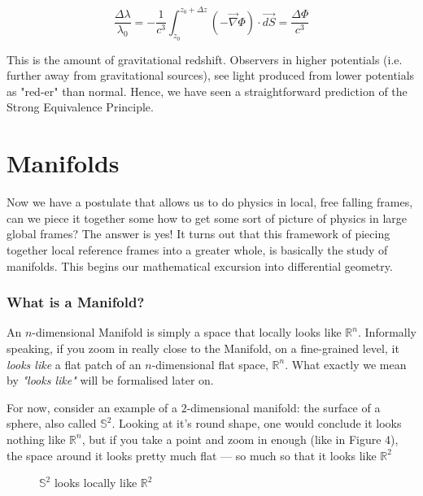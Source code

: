 \documentclass[10pt]{article}
\begin{document}
\begin{equation}
\label{Frequency Change continuous}
    \frac{\Delta{\lambda}}{\lambda_0} = -\frac{1}{c^3} \int_{z_0}^{z_0 + \Delta z} (-\vec{\nabla}\Phi) \cdot \vec{dS}  =  \frac{\Delta\Phi}{c^3}
\end{equation}

This is the amount of gravitational redshift. Observers in higher potentials (i.e. further away from gravitational sources), see light produced from lower potentials as "red-er"  than normal. Hence, we have seen a straightforward prediction of the Strong Equivalence Principle.   
\\
\pagebreak


\part{Manifolds}
Now we have a postulate that allows us to do physics in local, free falling frames, can we piece it together some how to get some sort of picture of physics in large global frames? The answer is yes!  It turns out that this framework of piecing together local reference frames into a greater whole, is basically the study of manifolds. This begins our mathematical excursion into differential geometry. 

\section{What is a Manifold?}

An $n$-dimensional Manifold is simply a space that locally looks like $\mathbb{R}^n$. Informally speaking, if you zoom in really close to the Manifold, on a fine-grained level, it \textit{looks like} a flat patch of an $n$-dimensional flat space, $\mathbb{R}^n$. What exactly we mean by \textit{"looks like"} will be formalised later on.

For now, consider an example of a $2$-dimensional manifold: the surface of a sphere, also called $\mathbb{S}^2$. Looking at it's round shape, one would conclude it looks nothing like $\mathbb{R}^n$, but if you take a point and zoom in enough (like in Figure 4), the space around it looks pretty much flat --- so much so that it looks like $\mathbb{R}^2$

\begin{figure}[h!]
\centering

\caption{$\mathbb{S}^2$ looks locally like $\mathbb{R}^2$}
\label{fig:my_label}
\end{figure}
\end{document}

